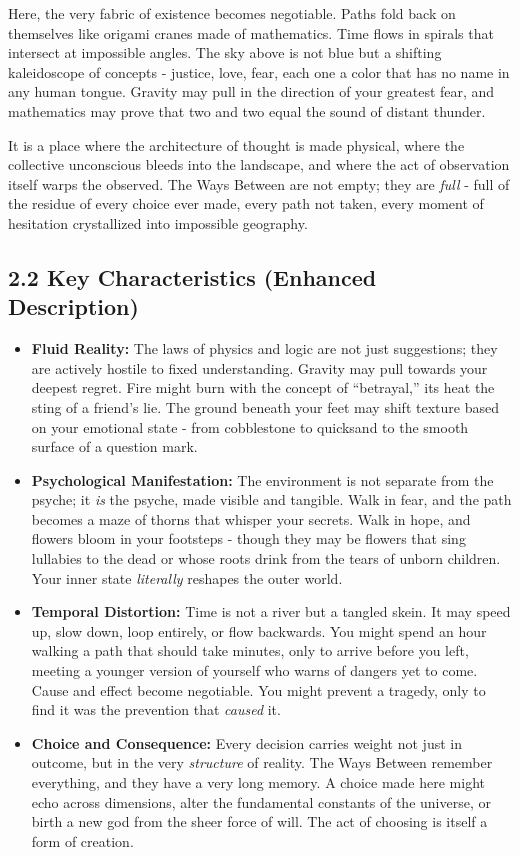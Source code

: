 \documentclass[11pt]{article}
\begin{document}
Here, the very fabric of existence becomes negotiable. Paths fold back on themselves like origami cranes made of mathematics. Time flows in spirals that intersect at impossible angles. The sky above is not blue but a shifting kaleidoscope of concepts - justice, love, fear, each one a color that has no name in any human tongue. Gravity may pull in the direction of your greatest fear, and mathematics may prove that two and two equal the sound of distant thunder.

It is a place where the architecture of thought is made physical, where the collective unconscious bleeds into the landscape, and where the act of observation itself warps the observed. The Ways Between are not empty; they are \textit{full} - full of the residue of every choice ever made, every path not taken, every moment of hesitation crystallized into impossible geography.

\subsection*{2.2 Key Characteristics (Enhanced Description)}

\begin{itemize}
\item \textbf{Fluid Reality:} The laws of physics and logic are not just suggestions; they are actively hostile to fixed understanding. Gravity may pull towards your deepest regret. Fire might burn with the concept of ``betrayal,'' its heat the sting of a friend's lie. The ground beneath your feet may shift texture based on your emotional state - from cobblestone to quicksand to the smooth surface of a question mark.
\item \textbf{Psychological Manifestation:} The environment is not separate from the psyche; it \textit{is} the psyche, made visible and tangible. Walk in fear, and the path becomes a maze of thorns that whisper your secrets. Walk in hope, and flowers bloom in your footsteps - though they may be flowers that sing lullabies to the dead or whose roots drink from the tears of unborn children. Your inner state \textit{literally} reshapes the outer world.
\item \textbf{Temporal Distortion:} Time is not a river but a tangled skein. It may speed up, slow down, loop entirely, or flow backwards. You might spend an hour walking a path that should take minutes, only to arrive before you left, meeting a younger version of yourself who warns of dangers yet to come. Cause and effect become negotiable. You might prevent a tragedy, only to find it was the prevention that \textit{caused} it.
\item \textbf{Choice and Consequence:} Every decision carries weight not just in outcome, but in the very \textit{structure} of reality. The Ways Between remember everything, and they have a very long memory. A choice made here might echo across dimensions, alter the fundamental constants of the universe, or birth a new god from the sheer force of will. The act of choosing is itself a form of creation.
\end{itemize}
\end{document}
